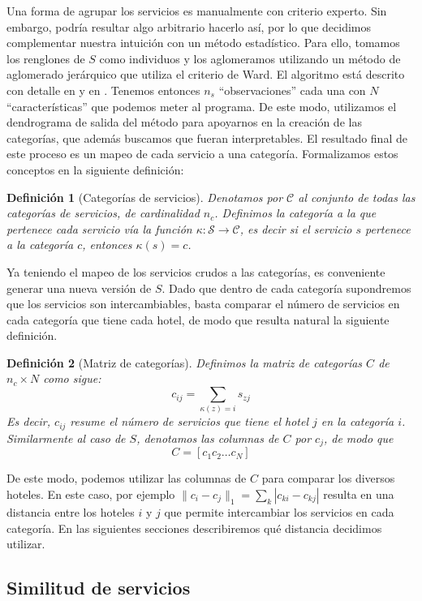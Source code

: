 \documentclass[12pt]{report}
\newtheorem{defn}{Definici\'on}[chapter]
\begin{document}
Una forma de agrupar los servicios es manualmente con criterio experto. Sin embargo, podría resultar algo arbitrario hacerlo así, por lo que decidimos complementar nuestra intuición con un método estadístico. Para ello, tomamos los renglones de $S$ como individuos y los aglomeramos utilizando un método de aglomerado jerárquico que utiliza el criterio de Ward. El algoritmo está descrito con detalle en \cite{ward} y en \cite{ward-notes}. Tenemos entonces $n_s$ ``observaciones'' cada una con $N$ ``características'' que podemos meter al programa. De este modo, utilizamos el dendrograma de salida del método para apoyarnos en la creación de las categorías, que además buscamos que fueran interpretables. El resultado final de este proceso es un mapeo de cada servicio a una categoría. Formalizamos estos conceptos en la siguiente definición:
\begin{defn}[Categorías de servicios]
Denotamos por $\mathcal{C}$ al conjunto de todas las categorías de servicios, de cardinalidad $n_c$. Definimos la categoría a la que pertenece cada servicio vía la función $\kappa: \mathcal{S} \to \mathcal{C}$, es decir si el servicio $s$ pertenece a la categoría $c$, entonces $\kappa(s) = c$.
\end{defn}
Ya teniendo el mapeo de los servicios crudos a las categorías, es conveniente generar una nueva versión de $S$. Dado que dentro de cada categoría supondremos que los servicios son intercambiables, basta comparar el número de servicios en cada categoría que tiene cada hotel, de modo que resulta natural la siguiente definición.
\begin{defn}[Matriz de categorías]
Definimos la matriz de categorías $C$ de $n_c \times N$ como sigue:
\[
c_{ij} = \sum_{\kappa(z) = i} s_{zj}
\]
Es decir, $c_{ij}$ resume el número de servicios que tiene el hotel $j$ en la categoría $i$. Similarmente al caso de $S$, denotamos las columnas de $C$ por $c_j$, de modo que
\[
C = [c_1 c_2 \dots c_N]
\]
\end{defn}
De este modo, podemos utilizar las columnas de $C$ para comparar los diversos hoteles. En este caso, por ejemplo $\|c_i - c_j\|_1 = \sum_k |c_{ki} - c_{kj}|$ resulta en una distancia entre los hoteles $i$ y $j$ que permite intercambiar los servicios en cada categoría. En las siguientes secciones describiremos qué distancia decidimos utilizar.

\subsection*{Similitud de servicios}
\end{document}
